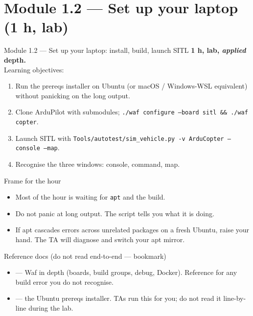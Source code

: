 \documentclass[aspectratio=169,11pt]{beamer}
\begin{document}
\section{Module 1.2 --- Set up your laptop (1 h, lab)}

\begin{frame}{Module 1.2 --- Set up your laptop: install, build, launch SITL}
  \textbf{1 h, lab, \emph{applied} depth.}\\[1ex]
  Learning objectives:
  \begin{enumerate}
    \item Run the prereqs installer on Ubuntu (or macOS / Windows-WSL equivalent) without panicking on the long output.
    \item Clone ArduPilot with submodules; \texttt{./waf configure --board sitl \&\& ./waf copter}.
    \item Launch SITL with \texttt{Tools/autotest/sim\_vehicle.py -v ArduCopter --console --map}.
    \item Recognise the three windows: console, command, map.
  \end{enumerate}
\end{frame}

\begin{frame}{Frame for the hour}
  \begin{itemize}
    \item Most of the hour is waiting for \texttt{apt} and the build.
    \item Do not panic at long output. The script tells you what it is doing.
    \item If apt cascades errors across unrelated packages on a fresh Ubuntu, raise your hand. The TA will diagnose and switch your apt mirror.
  \end{itemize}
\end{frame}

\begin{frame}{Reference docs (do not read end-to-end --- bookmark)}
  \begin{itemize}
    \item {} --- Waf in depth (boards, build groups, debug, Docker). Reference for any build error you do not recognise.
    \item {} --- the Ubuntu prereqs installer. TAs run this for you; do not read it line-by-line during the lab.
  \end{itemize}
\end{frame}
\end{document}
